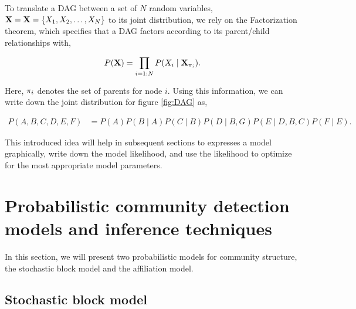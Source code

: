 To translate a DAG between a set of $N$ random variables, ${\bf X}={\bf X}=\{X_{1},X_{2},\dots,X_{N}\}$ to its joint distribution, we rely on the Factorization theorem, which specifies that a DAG factors according to its parent/child relationships with,

\begin{equation}
P({\bf X})=\prod_{i=1:N}P(X_{i} \mid {\bf X}_{\pi_{i}}).
\end{equation}

Here, ${\bf \pi}_{i}$ denotes the set of parents for node $i$. Using this information, we can write down the joint distribution for figure \ref{fig:DAG} as,

\begin{equation}
\begin{split}
P(A,B,C,D,E,F)&=P(A)P(B\mid A)P(C\mid B)P(D \mid B,G)P(E \mid D,B,C)P(F\mid E).
\end{split}
\end{equation}

This introduced idea will help in subsequent sections to expresses a model graphically, write down the model likelihood, and use the likelihood to optimize for the most appropriate model parameters. 


\chapter{Probabilistic community detection models and inference techniques}
\label{probTech}
In this section, we will present two probabilistic models for community structure, the stochastic block model and the affiliation model. 
\section{Stochastic block model}

